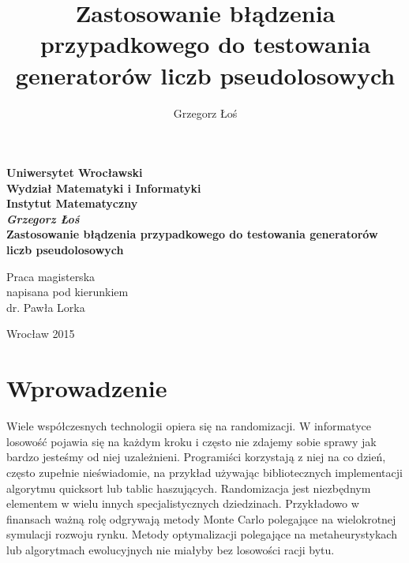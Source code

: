 \documentclass[a4paper,11pt,twoside]{book}
\title{Zastosowanie błądzenia przypadkowego do testowania generatorów liczb pseudolosowych}
\author{Grzegorz Łoś}
\theoremstyle{definition}
\begin{document}
\thispagestyle{empty}
\begin{center}
\textbf{\large Uniwersytet Wrocławski\\
Wydział Matematyki i Informatyki\\
Instytut Matematyczny}\\
\vspace{4cm}
\textbf{\textit{\large Grzegorz Łoś}\\
\vspace{0.5cm}
{\Large Zastosowanie błądzenia przypadkowego do testowania generatorów liczb pseudolosowych}}\\
\end{center}
\vspace{3cm}
{\large \hspace*{6.5cm}Praca magisterska\\
\hspace*{6.5cm}napisana pod kierunkiem\\
\hspace*{6.5cm}dr. Pawła Lorka }\\
\vfill
\begin{center}
{\large Wrocław 2015}\\
\end{center}

\newpage
\thispagestyle{empty}
\begin{minipage}{0.5\linewidth}
\end{minipage}

\newpage


\begin{minipage}{0.8\linewidth}
\tableofcontents
\end{minipage}

\chapter*{Wprowadzenie}
Wiele współczesnych technologii opiera się na randomizacji. W informatyce losowość pojawia się na każdym kroku i często nie zdajemy sobie sprawy jak bardzo jesteśmy od niej uzależnieni. Programiści korzystają z niej na co dzień, często zupełnie nieświadomie, na przykład używając bibliotecznych implementacji algorytmu quicksort lub tablic haszujących. Randomizacja jest niezbędnym elementem w wielu innych specjalistycznych dziedzinach. Przykładowo w finansach ważną rolę odgrywają metody Monte Carlo polegające na wielokrotnej symulacji rozwoju rynku. Metody optymalizacji polegające na metaheurystykach lub algorytmach ewolucyjnych nie miałyby bez losowości racji bytu.
\end{document}
